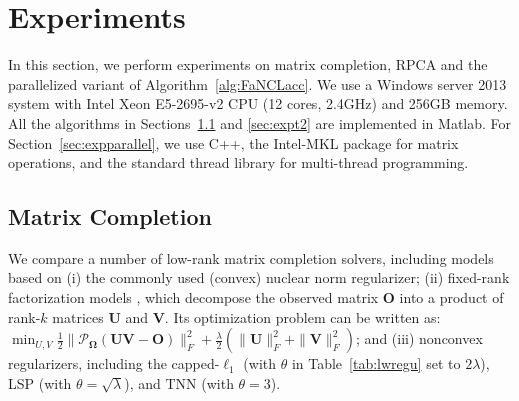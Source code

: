 \documentclass[10pt,journal,compsoc]{IEEEtran}
\newcommand{\NM}[2]{\| #1 \|_{#2} }
\newcommand{\SO}[1]{\mathcal{P}_{\mathbf{\Omega}}(#1)}
\begin{document}

\section{Experiments}
\label{sec:expts}

In this section, we perform experiments on matrix completion, RPCA  
and the parallelized variant of Algorithm~\ref{alg:FaNCLacc}.
We use a Windows server 2013 system with Intel Xeon E5-2695-v2 CPU (12 cores, 2.4GHz) and 256GB memory. 
All the
algorithms in Sections~\ref{sec:exptmc} and \ref{sec:expt2} are implemented in Matlab.
For Section~\ref{sec:expparallel},
we use C++, the Intel-MKL package
for matrix operations, and the standard thread library
for multi-thread programming.


\subsection{Matrix Completion}
\label{sec:exptmc}

We compare a number of low-rank matrix completion solvers, including
models based on 
(i) the commonly used (convex) nuclear norm regularizer; 
(ii) fixed-rank factorization models \cite{wen2012solving,wang2015orthogonal},
which decompose the  observed matrix $\mathbf{O}$ into a product of 
rank-$k$ matrices $\mathbf{U}$ and $\mathbf{V}$. Its optimization problem can be written as:
$\min_{U,V}\frac{1}{2}\NM{\SO{\mathbf{U} \mathbf{V} - \mathbf{O}}}{F}^2+ \frac{\lambda}{2}(\NM{\mathbf{U}}{F}^2 + \NM{\mathbf{V}}{F}^2)$;
and 
(iii) nonconvex regularizers, including the capped-$\ell_1$ (with $\theta$ in
Table~\ref{tab:lwregu} set to $2 \lambda$), LSP
(with $\theta = \sqrt{\lambda}$), and TNN
(with $\theta = 3$).
\end{document}
